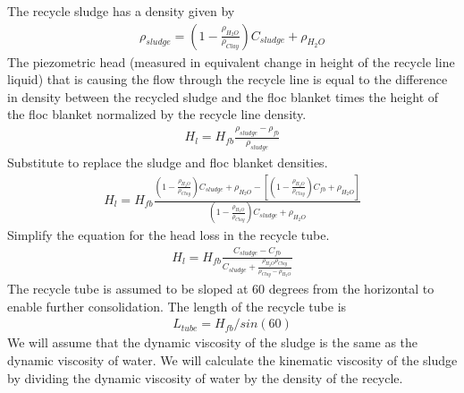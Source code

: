 \documentclass[letterpaper,10pt,english]{sphinxmanual}
\begin{document}
{The recycle sludge has a density given by
\begin{equation}\label{equation:Sedimentation/Sed_Theory_and_Future_Work:Sedimentation/Sed_Theory_and_Future_Work:11}
\begin{split}\rho_{sludge} = \left( 1 - \frac{\rho_{H_2O}}{\rho_{Clay}} \right) C_{sludge} + \rho_{H_2O}\end{split}
\end{equation}
The piezometric head (measured in equivalent change in height of the recycle line liquid) that is causing the flow through the recycle line is equal to the difference in density between the recycled sludge and the floc blanket times the height of the floc blanket normalized by the recycle line density.
\begin{equation}\label{equation:Sedimentation/Sed_Theory_and_Future_Work:Sedimentation/Sed_Theory_and_Future_Work:12}
\begin{split}H_l = H_{fb}\frac{\rho_{sludge} - \rho_{fb}}{\rho_{sludge}}\end{split}
\end{equation}
Substitute to replace the sludge and floc blanket densities.
\begin{equation}\label{equation:Sedimentation/Sed_Theory_and_Future_Work:Sedimentation/Sed_Theory_and_Future_Work:13}
\begin{split}H_l = H_{fb}\frac{\left( 1 - \frac{\rho_{H_2O}}{\rho_{Clay}} \right) C_{sludge} + \rho_{H_2O} -\left[  \left( 1 - \frac{\rho_{H_2O}}{\rho_{Clay}} \right) C_{fb} + \rho_{H_2O} \right]} {\left( 1 - \frac{\rho_{H_2O}}{\rho_{Clay}} \right) C_{sludge} + \rho_{H_2O}}\end{split}
\end{equation}
Simplify the equation for the head loss in the recycle tube.
\begin{equation}\label{equation:Sedimentation/Sed_Theory_and_Future_Work:Sedimentation/Sed_Theory_and_Future_Work:14}
\begin{split}H_l = H_{fb}\frac{ C_{sludge} -C_{fb}} { C_{sludge} + \frac{\rho_{H_2O}\rho_{Clay}}{  \rho_{Clay} -\rho_{H_2O} }}\end{split}
\end{equation}
The recycle tube is assumed to be sloped at 60 degrees from the horizontal to enable further consolidation. The length of the recycle tube is
\begin{equation}\label{equation:Sedimentation/Sed_Theory_and_Future_Work:Sedimentation/Sed_Theory_and_Future_Work:15}
\begin{split}L_{tube} = H_{fb}/sin(60)\end{split}
\end{equation}
We will assume that the dynamic viscosity of the sludge is the same as the dynamic viscosity of water. We will calculate the kinematic viscosity of the sludge by dividing the dynamic viscosity of water by the density of the recycle.

}
\end{document}
